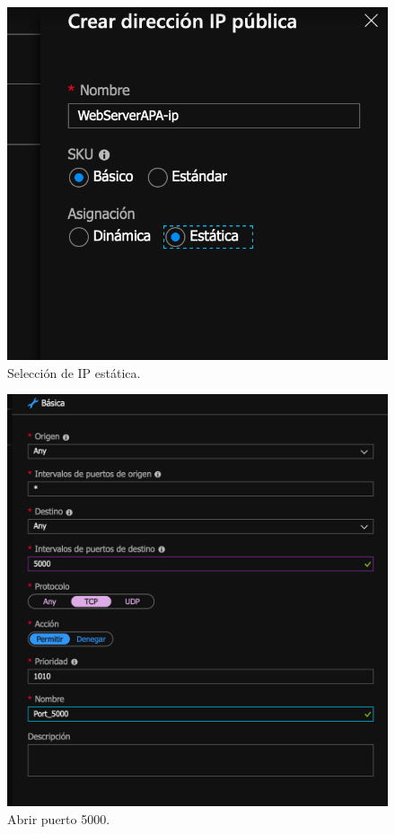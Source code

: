 \documentclass[english,runningheads,a4paper]{llncs}[2018/03/10]
\begin{document}
\begin{figure}[h!]
 \includegraphics[width=\linewidth]{./Web/Azure/Azure1.png}
 \caption{Selección de IP estática.}
\end{figure}

\begin{figure}[h!]
 \includegraphics[width=\linewidth]{./Web/Azure/Azure2.png}
 \caption{Abrir puerto 5000.}
\end{figure}
\end{document}
